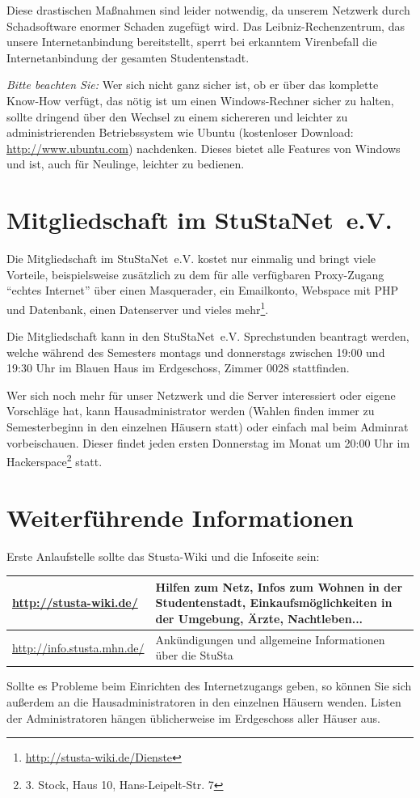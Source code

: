 \documentclass[a4paper,12pt]{scrartcl}
\begin{document}
Diese drastischen Maßnahmen sind leider notwendig, da unserem Netzwerk durch Schadsoftware enormer Schaden zugefügt wird. Das Leibniz-Rechenzentrum, das unsere Internetanbindung bereitstellt, sperrt bei erkanntem Virenbefall die Internetanbindung der gesamten Studentenstadt.

\emph{Bitte beachten Sie:} Wer sich nicht ganz sicher ist, ob er über das komplette Know-How verfügt, das nötig ist um einen Windows-Rechner sicher zu halten, sollte dringend über den Wechsel zu einem sichereren und leichter zu administrierenden Betriebssystem wie Ubuntu (kostenloser Download: \url{http://www.ubuntu.com}) nachdenken. Dieses bietet alle Features von Windows und ist, auch für Neulinge, leichter zu bedienen.


\section*{Mitgliedschaft im StuStaNet~e.V.}

Die Mitgliedschaft im StuStaNet~e.V. kostet nur einmalig  und bringt viele Vorteile, beispielsweise zusätzlich zu dem für alle verfügbaren Proxy-Zugang "`echtes Internet"' über einen Masquerader, ein Emailkonto, Webspace mit PHP und Datenbank, einen Datenserver und vieles mehr\footnote{\url{http://stusta-wiki.de/Dienste}}.

Die Mitgliedschaft kann in den StuStaNet~e.V. Sprechstunden beantragt werden, welche während des Semesters montags und donnerstags zwischen 19:00 und 19:30 Uhr im Blauen Haus im Erdgeschoss, Zimmer 0028 stattfinden.

Wer sich noch mehr für unser Netzwerk und die Server interessiert oder eigene Vorschläge hat, kann Hausadministrator werden (Wahlen finden immer zu Semesterbeginn in den einzelnen Häusern statt) oder einfach mal beim Adminrat vorbeischauen. Dieser findet jeden ersten Donnerstag im Monat um 20:00 Uhr im Hackerspace\footnote{3. Stock, Haus 10, Hans-Leipelt-Str. 7} statt.

\section*{Weiterführende Informationen}

Erste Anlaufstelle sollte das Stusta-Wiki und die Infoseite sein:

\begin{center}
  \begin{tabularx}{\linewidth}{|lX|}
    \hline
    \url{http://stusta-wiki.de/} & Hilfen zum Netz, Infos zum Wohnen in der Studentenstadt, Einkaufsmöglichkeiten in der Umgebung, Ärzte, Nachtleben...\\
    \hline
    \url{http://info.stusta.mhn.de/} & Ankündigungen und allgemeine Informationen über die StuSta\\
    \hline
  \end{tabularx}
\end{center}
Sollte es Probleme beim Einrichten des Internetzugangs geben, so können Sie sich außerdem an die Hausadministratoren in den einzelnen Häusern wenden. Listen der Administratoren hängen üblicherweise im Erdgeschoss aller Häuser aus.
\end{document}
